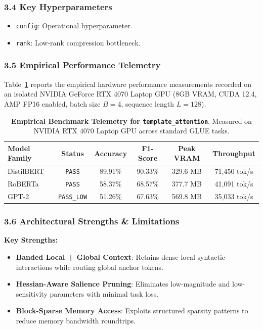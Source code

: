 \subsubsection*{3.4 Key Hyperparameters}
\begin{itemize}
    \item \texttt{config}: Operational hyperparameter.
    \item \texttt{rank}: Low-rank compression bottleneck.
\end{itemize}

\subsubsection*{3.5 Empirical Performance Telemetry}
Table~\ref{tab:telemetry_template_attention} reports the empirical hardware performance measurements recorded on an isolated NVIDIA GeForce RTX 4070 Laptop GPU (8GB VRAM, CUDA 12.4, AMP FP16 enabled, batch size $B=4$, sequence length $L=128$).

\begin{table}[h]
\centering
\small
\caption{\textbf{Empirical Benchmark Telemetry for \texttt{template\_attention}}. Measured on NVIDIA RTX 4070 Laptop GPU across standard GLUE tasks.}
\label{tab:telemetry_template_attention}
\begin{tabular*}{\columnwidth}{@{\extracolsep{\fill}}lccccc}
\toprule
\textbf{Model Family} & \textbf{Status} & \textbf{Accuracy} & \textbf{F1-Score} & \textbf{Peak VRAM} & \textbf{Throughput} \\
\midrule
DistilBERT & \texttt{PASS} & 89.91\% & 90.33\% & 329.6 MB & 71,450 tok/s \\
RoBERTa & \texttt{PASS} & 58.37\% & 68.57\% & 377.7 MB & 41,091 tok/s \\
GPT-2 & \texttt{PASS\_LOW} & 51.26\% & 67.63\% & 569.8 MB & 35,033 tok/s \\
\bottomrule
\end{tabular*}
\end{table}

\subsubsection*{3.6 Architectural Strengths \& Limitations}
\textbf{Key Strengths:}
\begin{itemize}
    \item \textbf{Banded Local + Global Context}: Retains dense local syntactic interactions while routing global anchor tokens.
    \item \textbf{Hessian-Aware Salience Pruning}: Eliminates low-magnitude and low-sensitivity parameters with minimal task loss.
    \item \textbf{Block-Sparse Memory Access}: Exploits structured sparsity patterns to reduce memory bandwidth roundtrips.
\end{itemize}

